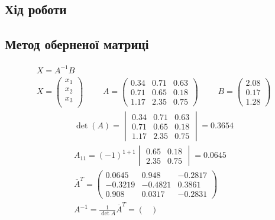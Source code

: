 \documentclass{article}
\begin{document}
\begin{large}
		\section*{Хід роботи}
		\subsection*{Метод оберненої матриці}
		\begin{gather}\nonumber
			X=A^{-1}B\\\nonumber
				X=\begin{pmatrix}
					x_1\\
					x_2\\
					x_3\\
				\end{pmatrix}
				\hspace{28pt}
				A=\begin{pmatrix}
					0.34 & 0.71 & 0.63\\
					0.71 & 0.65 & 0.18\\
					1.17 & 2.35 & 0.75
				\end{pmatrix}
			\hspace{28pt}
			B=\begin{pmatrix}
				2.08\\
				0.17\\
				1.28
			\end{pmatrix}
		\end{gather}
	\begin{gather}
			\det(A)=\begin{vmatrix}\nonumber
				0.34 & 0.71 & 0.63\\
				0.71 & 0.65 & 0.18\\
				1.17 & 2.35 & 0.75
			\end{vmatrix} = 0.3654
		\\
			A_{11}=(-1)^{1+1}\begin{vmatrix}\nonumber
				0.65 & 0.18\\
				2.35 & 0.75
			\end{vmatrix} = 0.0645
			\\
			\overline{A}^T = \begin{pmatrix}\nonumber
				0.0645 & 0.948 & -0.2817\\
				-0.3219 & -0.4821 & 0.3861\\
				0.908 & 0.0317 & -0.2831
			\end{pmatrix}
			\\
			A^{-1} = \frac{1}{\det{A}}\overline{A}^T = \begin{pmatrix}\nonumber

\end{pmatrix}
\end{gather}
\end{large}
\end{document}
